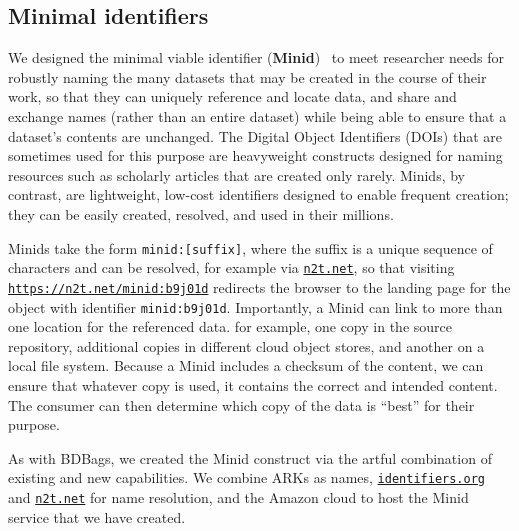 \documentclass[11pt]{article}
\begin{document}

\subsection{Minimal identifiers}

We designed the minimal viable identifier (\textbf{Minid})~\cite{chard16} to meet researcher needs
for robustly naming the many datasets that may be created in the course of their work, 
so that they can uniquely reference and locate data,
and share and exchange names (rather than an entire dataset) 
while being able to ensure that a dataset's contents are unchanged.
The Digital Object Identifiers (DOIs) that are sometimes used for this purpose
are heavyweight constructs designed for naming resources such as scholarly articles
that are created only rarely.
Minids, by contrast, are lightweight, low-cost identifiers designed to enable frequent creation;
they can be easily created, resolved, and used in their millions. 

Minids  take the form \texttt{minid:[suffix]}, where  the suffix is a unique sequence of characters
and can be resolved, for example via \texttt{\href{https://n2t.net}{n2t.net}},
so that visiting
\texttt{\href{https://n2t.net/minid:b9j01d}{https://n2t.net/minid:b9j01d}} 
redirects the browser to the landing page for the
object with identifier \texttt{minid:b9j01d}.
Importantly, a Minid can link to more than one location for the referenced data.
for example, one copy in the source repository, 
additional copies in different cloud object stores, and another on a local file system.
Because a Minid includes a checksum of the content, 
we can ensure that whatever copy is used, it contains the correct and intended content.
The consumer can then determine which copy of the data is ``best'' for their purpose.

As with BDBags, we created the Minid construct via the artful combination of existing and new capabilities.
We combine ARKs as names, 
\texttt{\href{https://identifiers.org}{identifiers.org}} and \texttt{\href{https://n2t.net}{n2t.net}} for name resolution,
and the Amazon cloud to host the Minid service that we have created. 
\end{document}
